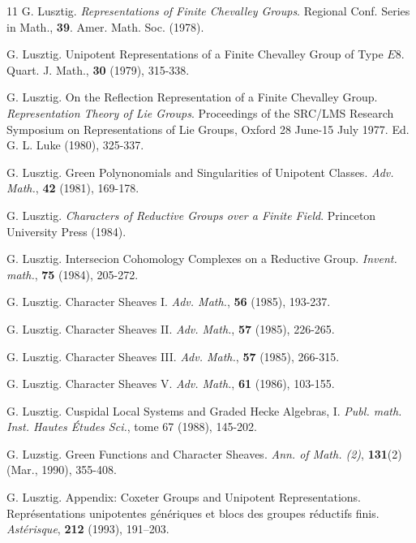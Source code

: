 \documentclass[a4paper,10pt,leqno]{amsart}
\theoremstyle{plain}
\theoremstyle{plain}
\theoremstyle{plain}
\theoremstyle{definition}
\theoremstyle{remark}
\begin{document}
\begin{thebibliography}{11}
	G. Lusztig.
	\textsl{Representations of Finite Chevalley Groups}.
	Regional Conf. Series in Math.,
	\textbf{39}.
	Amer. Math. Soc.
	(1978).

	G. Lusztig.
	Unipotent Representations of a Finite Chevalley Group of Type $E8$.
	Quart. J. Math.,
	\textbf{30}
	(1979),
	315-338.
	
	G. Lusztig.
	On the Reflection Representation of a Finite Chevalley Group.
	\textsl{Representation Theory of Lie Groups}.
	Proceedings of the SRC/LMS Research Symposium on Representations of Lie Groups, Oxford 28 June-15 July 1977.
	Ed. G. L. Luke
	(1980),
	325-337.
	
	G. Lusztig.
	Green Polynonomials and Singularities of Unipotent Classes.
	\textsl{Adv. Math.},
	\textbf{42}
	(1981),
	169-178.

	G. Lusztig.
	\textsl{Characters of Reductive Groups over a Finite Field}.
	Princeton University Press
	(1984).	
	
	G. Lusztig.
	Intersecion Cohomology Complexes on a Reductive Group.
	\textsl{Invent. math.},
	\textbf{75}
	(1984),
	205-272.

	G. Lusztig.
	Character Sheaves I.
	\textsl{Adv. Math.},
	\textbf{56}
	(1985),
	193-237.
	
	G. Lusztig.
	Character Sheaves II.
	\textsl{Adv. Math.},
	\textbf{57}
	(1985),
	226-265.
	
	G. Lusztig.
	Character Sheaves III.
	\textsl{Adv. Math.},
	\textbf{57}
	(1985),
	266-315.
	
	G. Lusztig.
	Character Sheaves V.
	\textsl{Adv. Math.},
	\textbf{61}
	(1986),
	103-155.
	
	G. Lusztig.
	Cuspidal Local Systems and Graded Hecke Algebras, I.
	\textsl{Publ. math. Inst. Hautes \'Etudes Sci.},
	tome 67
	(1988),
	145-202.
	
	G. Luzstig.
	Green Functions and Character Sheaves.
	\textsl{Ann. of Math. (2)},
	\textbf{131}(2)
	(Mar., 1990),
	355-408.
	
	G. Lusztig.
	Appendix: Coxeter Groups and Unipotent Representations.
	Repr\'esentations unipotentes g\'en\'eriques et blocs des groupes r\'eductifs finis.
	\textsl{Ast\'erisque},
	\textbf{212}
	(1993),
	191–203.


\end{thebibliography}
\end{document}
